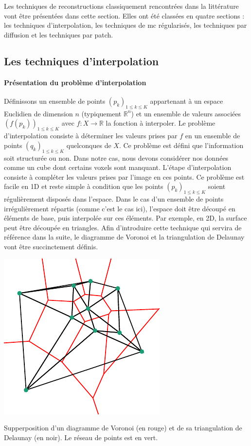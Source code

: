 Les techniques de reconstructions classiquement rencontrées dans la littérature vont être présentées dans cette section. Elles ont été classées en quatre sections : les techniques d'interpolation, les techniques de \gls{mc} régularisés, les techniques par diffusion et les techniques par patch.

\subsection{Les techniques d'interpolation}

\paragraph{Présentation du problème d'interpolation} Définissons un ensemble de points $(p_k)_{1\leq k\leq K}$ appartenant à un espace Euclidien de dimension $n$ (typiquement $\mathbb{R}^n$) et un ensemble de valeurs associées $(f(p_k))_{1\leq k\leq K}$ avec $f:X\rightarrow \mathbb{R}$ la fonction à interpoler. Le problème d'interpolation consiste à déterminer les valeurs prises par $f$ en un ensemble de points $(q_k)_{1\leq k\leq K}$ quelconques de $X$.
%
Ce problème est défini que l'information soit structurée ou non. Dans notre cas, nous devons considérer nos données comme un cube dont certains voxels sont manquant. L'étape d'interpolation consiste à compléter les valeurs prises par l'image en ces points.
%
Ce problème est facile en 1D et reste simple à condition que les points $(p_k)_{1\leq k\leq K}$ soient régulièrement disposés dans l'espace. Dans le cas d'un ensemble de points irrégulièrement répartis (comme c'est le cas ici), l'espace doit être découpé en éléments de base, puis interpolée sur ces éléments. Par exemple, en 2D, la surface peut être découpée en triangles. Afin d'introduire cette technique qui servira de référence dans la suite, le diagramme de Voronoi et la triangulation de Delaunay vont être succinctement définis.


\begin{marginfigure}
    \centering
    \includegraphics[]{img/chapitre3/figure3/Voronoi.pdf}
    \caption{Supperposition d'un diagramme de Voronoi (en rouge) et de sa triangulation de Delaunay (en noir). Le réseau de points est en vert.}
    \label{fig-voronoi}
\end{marginfigure}
